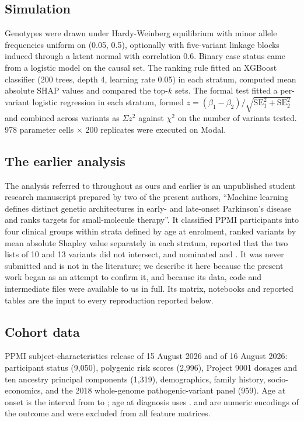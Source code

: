 \documentclass[10pt]{article}
\begin{document}
\subsection*{Simulation}

Genotypes were drawn under Hardy-Weinberg equilibrium with minor allele frequencies uniform on
(0.05, 0.5), optionally with five-variant linkage blocks induced through a latent normal with
correlation 0.6. Binary case status came from a logistic model on the causal set. The ranking rule
fitted an XGBoost classifier (200 trees, depth 4, learning rate 0.05) in each stratum, computed
mean absolute SHAP values and compared the top-$k$ sets. The formal test fitted a per-variant
logistic regression in each stratum, formed $z = (\beta_1 - \beta_2)/\sqrt{\mathrm{SE}_1^2 +
\mathrm{SE}_2^2}$ and combined across variants as $\Sigma z^2$ against $\chi^2$ on the number of
variants tested. 978 parameter cells $\times$ 200 replicates were executed on Modal.

\subsection*{The earlier analysis}

The analysis referred to throughout as ours and earlier is an unpublished student research
manuscript prepared by two of the present authors, ``Machine learning defines distinct genetic
architectures in early- and late-onset Parkinson's disease and ranks targets for small-molecule
therapy''. It classified PPMI participants into four clinical groups within strata defined by age
at enrolment, ranked variants by mean absolute Shapley value separately in each stratum, reported
that the two lists of 10 and 13 variants did not intersect, and nominated  and
. It was never submitted and is not in the literature; we describe it here because the
present work began as an attempt to confirm it, and because its data, code and intermediate files
were available to us in full. Its matrix, notebooks and reported tables are the input to every
reproduction reported below.

\subsection*{Cohort data}

PPMI subject-characteristics release of 15 August 2026 and  of 16
August 2026: participant status (9,050), polygenic risk scores (2,996), Project 9001 dosages and
ten ancestry principal components (1,319), demographics, family history, socio-economics, and the
2018 whole-genome pathogenic-variant panel (959). Age at onset is the interval from 
to ; age at diagnosis uses .  and  are numeric
encodings of the outcome and were excluded from all feature matrices.
\end{document}
